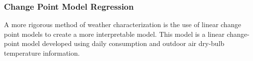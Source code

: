 \subsubsection{Change Point Model Regression}
\label{sec:changepointmodels}

A more rigorous method of weather characterization is the use of linear change point models to create a more interpretable model. This model is a linear change-point model developed using daily consumption and outdoor air dry-bulb temperature information.